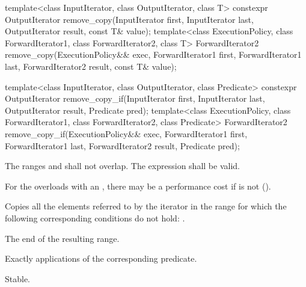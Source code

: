 %
%
\begin{itemdecl}
template<class InputIterator, class OutputIterator, class T>
  constexpr OutputIterator
    remove_copy(InputIterator first, InputIterator last,
                OutputIterator result, const T& value);
template<class ExecutionPolicy, class ForwardIterator1, class ForwardIterator2,
         class T>
  ForwardIterator2
    remove_copy(ExecutionPolicy&& exec,
                ForwardIterator1 first, ForwardIterator1 last,
                ForwardIterator2 result, const T& value);

template<class InputIterator, class OutputIterator, class Predicate>
  constexpr OutputIterator
    remove_copy_if(InputIterator first, InputIterator last,
                   OutputIterator result, Predicate pred);
template<class ExecutionPolicy, class ForwardIterator1, class ForwardIterator2,
         class Predicate>
  ForwardIterator2
    remove_copy_if(ExecutionPolicy&& exec,
                   ForwardIterator1 first, ForwardIterator1 last,
                   ForwardIterator2 result, Predicate pred);
\end{itemdecl}

\begin{itemdescr}
\pnum
\requires
The ranges
and
shall not overlap. The expression  shall be valid.
\begin{note}
For the overloads with an , there may be a performance
cost if  is not
 ().
\end{note}

\pnum
\effects
Copies all the elements referred to by the iterator
in the range
for which the following corresponding conditions do not hold:
.

\pnum
\returns
The end of the resulting range.

\pnum
\complexity
Exactly
applications of the corresponding predicate.

\pnum
\remarks Stable.
\end{itemdescr}

